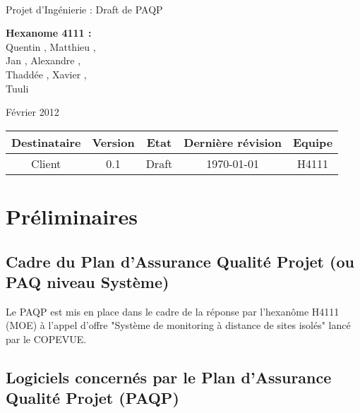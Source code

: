 \documentclass[a4paper]{article}
\begin{document}
\begin{titlepage}
~ 
\vfill
	\begin{center}
		\begin{Huge}
		Projet d'Ingénierie : Draft de PAQP\\
		\end{Huge} 
\vfill
		\textbf{Hexanome 4111 :} 
		\\Quentin {}, Matthieu , 
		\\Jan {}, Alexandre , 
		\\Thaddée , Xavier ,
		\\Tuuli {}
\vfill		
		\begin{Large}
		Février 2012
		\end{Large}
\vfill
	\begin{tabular}{|c|c|c|c|c|}
 	 \hline
   Destinataire & Version & Etat & Dernière révision & Equipe \\
   \hline
   Client & 0.1 & Draft & \today & H4111 \\
   \hline
	\end{tabular}
	\end{center}
\vfill
\end{titlepage}
\newpage
\tableofcontents
\newpage


\section{Préliminaires}

\subsection{Cadre du Plan d'Assurance Qualité Projet (ou PAQ niveau Système)}

Le PAQP est mis en place dans le cadre de la réponse par l'hexanôme H4111 (MOE) à l'appel d'offre "Système de monitoring à distance de sites isolés" lancé par le COPEVUE.

\subsection{Logiciels concernés par le Plan d'Assurance Qualité Projet (PAQP)}
\end{document}
